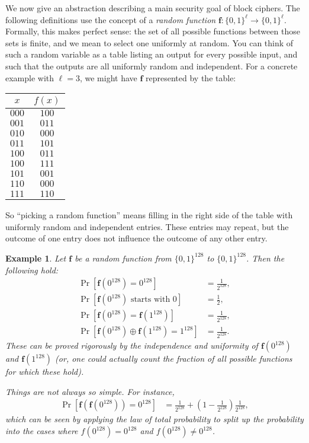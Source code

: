 \documentclass[11pt]{article}
\newtheorem{example}{Example}
\newcommand{\bits}{\{0,1\}}
\newcommand{\bof}{\mathbf{f}}
\begin{document}
We now give an abstraction describing a main security goal of block ciphers.
The following definitions use the concept of a \emph{random function}
$\bof:\bits^\ell\to\bits^\ell$. Formally, this makes perfect sense: the
set of all possible functions between those sets is finite, and we mean
to select one uniformly at random. 
You can think of such a random variable
as a table listing an output for every possible input, and such that
the outputs are all uniformly random and independent. For a concrete
example with $\ell=3$, we might have $\bof$ represented by the table:
\begin{center}
\begin{tabular}{c|c}
    $x$ & $f(x)$ \\\hline
    $000$ & $100$ \\
    $001$ & $011$ \\
    $010$ & $000$ \\
    $011$ & $101$ \\
    $100$ & $011$ \\
    $100$ & $111$ \\
    $101$ & $001$ \\
    $110$ & $000$ \\
    $111$ & $110$
\end{tabular}
\end{center}
So ``picking a random function'' means filling in the right side of the table
with uniformly random and independent entries. These entries may repeat, but
the outcome of one entry does not influence the outcome of any other entry.

\begin{example}
Let $\bof$ be a random function from $\bits^{128}$ to $\bits^{128}$.
Then the following hold:
    \begin{align*}
        \Pr[\bof(0^{128}) = 0^{128}] &= \frac{1}{2^{128}}, \\
        \Pr[\bof(0^{128}) \text{ starts with $0$}] &= \frac{1}{2}, \\
        \Pr[\bof(0^{128}) = \bof(1^{128})] &= \frac{1}{2^{128}}, \\
        \Pr[\bof(0^{128}) \oplus \bof(1^{128}) = 1^{128}] &= \frac{1}{2^{128}}.
    \end{align*}
    These can be proved rigorously by the independence and uniformity of
    $\bof(0^{128})$ and $\bof(1^{128})$ (or, one could actually count
    the fraction of all possible functions for which these hold).
    
    Things are not always so simple. For instance,
    \begin{align*}
        \Pr[\bof(\bof(0^{128})) = 0^{128}] &= 
        \frac{1}{2^{128}} + (1-\frac{1}{2^{128}})\frac{1}{2^{128}},
    \end{align*}
    which can be seen by applying the law of total probability to split
    up the probability into the cases where $f(0^{128})=0^{128}$ and
     $f(0^{128})\neq0^{128}$.
\end{example}
\end{document}
